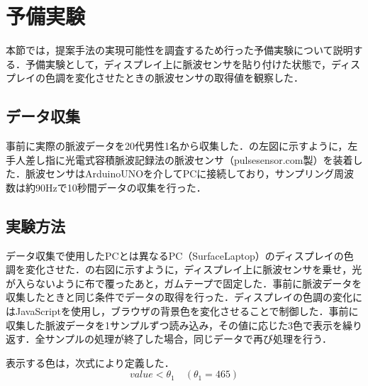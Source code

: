 \documentclass[Japanese,noauthor]{dicomopapers}
\begin{document}






\section{予備実験}
\label{preliminary}
本節では，提案手法の実現可能性を調査するため行った予備実験について説明する．予備実験として，ディスプレイ上に脈波センサを貼り付けた状態で，ディスプレイの色調を変化させたときの脈波センサの取得値を観察した．


\subsection{データ収集}
事前に実際の脈波データを20代男性1名から収集した．の左図に示すように，左手人差し指に光電式容積脈波記録法の脈波センサ（pulsesensor.com製）を装着した．脈波センサはArduinoUNOを介してPCに接続しており，サンプリング周波数は約90Hzで10秒間データの収集を行った．

\subsection{実験方法}
データ収集で使用したPCとは異なるPC（SurfaceLaptop）のディスプレイの色調を変化させた．の右図に示すように，ディスプレイ上に脈波センサを乗せ，光が入らないように布で覆ったあと，ガムテープで固定した．事前に脈波データを収集したときと同じ条件でデータの取得を行った．ディスプレイの色調の変化にはJavaScriptを使用し，ブラウザの背景色を変化させることで制御した．事前に収集した脈波データを1サンプルずつ読み込み，その値に応じた3色で表示を繰り返す．全サンプルの処理が終了した場合，同じデータで再び処理を行う．
\par

表示する色は，次式により定義した．
\begin{equation}
  \label{eqn:low}
  value < \theta_{1} \quad (\theta_{1}=465)
\end{equation}
\end{document}
